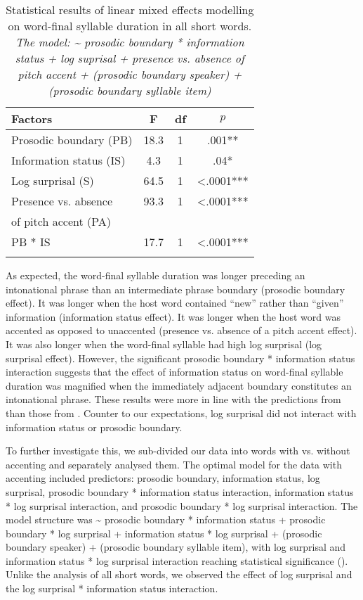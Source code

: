 \documentclass[output=paper,colorlinks,citecolor=brown]{langscibook}
\begin{document}
\begin{table}
\begin{tabular}{l S[table-format=2.1] c S[table-format=<1.4{***}]}
\lsptoprule
 {F}actors & {F} & df & {$p$}\\ \midrule
 Prosodic boundary (PB)  & 18.3 & 1 & .001{**}\\
 Information status (IS) & 4.3 & 1 & .04{*}\\
 Log surprisal (S)       & 64.5 & 1 & <.0001{***}\\
 Presence vs. absence  & 93.3 & 1 & <.0001{***}\\
 \quad of pitch accent (PA) & \\
 PB * IS & 17.7 & 1 & <.0001{***}\\
\lspbottomrule
\end{tabular}
\caption{Statistical results of linear mixed effects modelling on word-final syllable duration in all short words. \textit{The model: {\textasciitilde} prosodic boundary * information status + log suprisal + presence vs. absence of pitch accent + (prosodic boundary {\textbar} speaker) + (prosodic boundary {\textbar} syllable item)}}
\label{table:3}
\end{table}

As expected, the word-final syllable duration was longer preceding an intonational phrase than an intermediate phrase boundary (prosodic boundary effect). It was longer when the host word contained “new” rather than “given” information (information status effect). It was longer when the host word was accented as opposed to unaccented (presence vs. absence of a pitch accent effect).  It was also longer when the word-final syllable had high log surprisal (log surprisal effect). However, the significant prosodic boundary * information status interaction suggests that the effect of information status on word-final syllable duration was magnified when the immediately adjacent boundary constitutes an intonational phrase. These results were more in line with the predictions from \citet{Baker2009} than those from \citet{Aylett2004}. Counter to our expectations, log surprisal did not interact with information status or prosodic boundary.

To further investigate this, we sub-divided our data into words with vs. without accenting and separately analysed them. The optimal model for the data with accenting included predictors: prosodic boundary, information status, log surprisal, prosodic boundary * information status interaction, information status * log surprisal interaction, and prosodic boundary * log surprisal interaction. The model structure was {\textasciitilde} prosodic boundary * information status + prosodic boundary * log surprisal + information status * log surprisal + (prosodic boundary {\textbar} speaker) + (prosodic boundary {\textbar} syllable item), with log surprisal and information status * log surprisal interaction reaching statistical significance (). Unlike the analysis of all short words, we observed the effect of log surprisal and the log surprisal * information status interaction.
\end{document}
